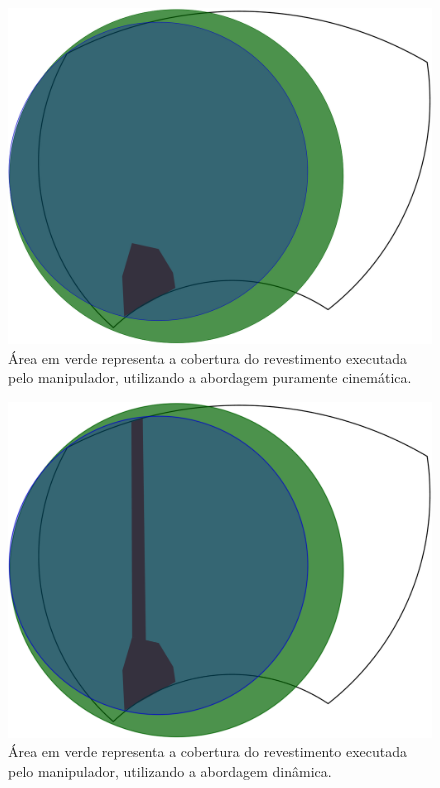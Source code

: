 \begin{figure}[h!]	
	\includegraphics[width=\columnwidth]{detail/figs/dinamica/workspaceCinematica.png}
	\caption{Área em verde representa a cobertura do revestimento executada pelo
	manipulador, utilizando a abordagem puramente cinemática.}
	\label{fig::wcin}
\end{figure}

\begin{figure}[h!]	
	\includegraphics[width=\columnwidth]{detail/figs/dinamica/workspaceTorques.png}
	\caption{Área em verde representa a cobertura do revestimento executada pelo
	manipulador, utilizando a abordagem dinâmica.}
	\label{fig::wdin}
\end{figure}